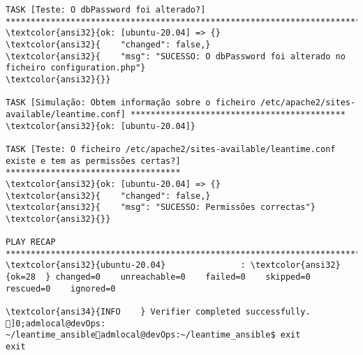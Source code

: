\documentclass{scrartcl}
\begin{document}
\begin{Verbatim}
TASK [Teste: O dbPassword foi alterado?] *************************************************************************************************
\textcolor{ansi32}{ok: [ubuntu-20.04] => {}
\textcolor{ansi32}{    "changed": false,}
\textcolor{ansi32}{    "msg": "SUCESSO: O dbPassword foi alterado no ficheiro configuration.php"}
\textcolor{ansi32}{}}

TASK [Simulação: Obtem informação sobre o ficheiro /etc/apache2/sites-available/leantime.conf] *******************************************
\textcolor{ansi32}{ok: [ubuntu-20.04]}

TASK [Teste: O ficheiro /etc/apache2/sites-available/leantime.conf existe e tem as permissões certas?] ***********************************
\textcolor{ansi32}{ok: [ubuntu-20.04] => {}
\textcolor{ansi32}{    "changed": false,}
\textcolor{ansi32}{    "msg": "SUCESSO: Permissões correctas"}
\textcolor{ansi32}{}}

PLAY RECAP *******************************************************************************************************************************
\textcolor{ansi32}{ubuntu-20.04}               : \textcolor{ansi32}{ok=28  } changed=0    unreachable=0    failed=0    skipped=0    rescued=0    ignored=0

\textcolor{ansi34}{INFO    } Verifier completed successfully.
]0;admlocal@devOps: ~/leantime_ansibleadmlocal@devOps:~/leantime_ansible$ exit
exit

\end{Verbatim}
\end{document}
